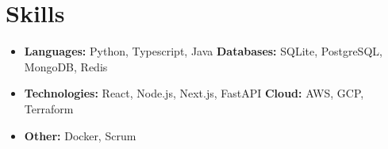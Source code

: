 \documentclass[a4paper,10pt]{article}
\newcommand{\resumeSubHeadingListStart}{\begin{itemize}[leftmargin=*]}
\newcommand{\resumeSubHeadingListEnd}{\end{itemize}}
\begin{document}
\section{Skills}
\resumeSubHeadingListStart
\item{
            \textbf{Languages: }{Python, Typescript, Java}
            \hfill
            \textbf{Databases: }{SQLite, PostgreSQL, MongoDB, Redis}
      }
\item{
            \textbf{Technologies: }{React, Node.js, Next.js, FastAPI}
            \hfill
            \textbf{Cloud: }{AWS, GCP, Terraform}
      }
\item{
            \textbf{Other: }{Docker, Scrum }
      }
\resumeSubHeadingListEnd
\end{document}
